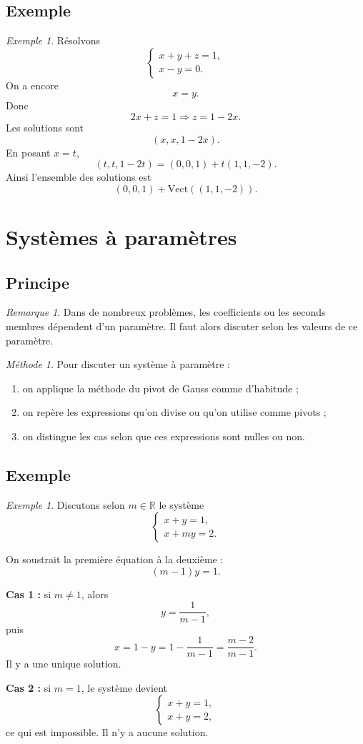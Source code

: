 \documentclass[11pt,a4paper]{article}
\theoremstyle{remark}
\newtheorem{remarque}[definition]{Remarque}
\newtheorem{exemple}[definition]{Exemple}
\newtheorem*{methode}{Méthode}
\newcommand{\R}{\mathbb{R}}
\newcommand{\Vect}{\mathrm{Vect}}
\begin{document}
\subsection{Exemple}

\begin{exemple}
Résolvons
\[
\begin{cases}
x+y+z=1,\\
x-y=0.
\end{cases}
\]
On a encore
\[
x=y.
\]
Donc
\[
2x+z=1 \Longrightarrow z=1-2x.
\]
Les solutions sont
\[
(x,x,1-2x).
\]
En posant \(x=t\),
\[
(t,t,1-2t)=(0,0,1)+t(1,1,-2).
\]
Ainsi l’ensemble des solutions est
\[
(0,0,1)+\Vect((1,1,-2)).
\]
\end{exemple}

\section{Systèmes à paramètres}

\subsection{Principe}

\begin{remarque}
Dans de nombreux problèmes, les coefficients ou les seconds membres dépendent d’un paramètre. Il faut alors discuter selon les valeurs de ce paramètre.
\end{remarque}

\begin{methode}
Pour discuter un système à paramètre :
\begin{enumerate}
    \item on applique la méthode du pivot de Gauss comme d’habitude ;
    \item on repère les expressions qu’on divise ou qu’on utilise comme pivots ;
    \item on distingue les cas selon que ces expressions sont nulles ou non.
\end{enumerate}
\end{methode}

\subsection{Exemple}

\begin{exemple}
Discutons selon \(m\in\R\) le système
\[
\begin{cases}
x+y=1,\\
x+my=2.
\end{cases}
\]

On soustrait la première équation à la deuxième :
\[
(m-1)y=1.
\]

\textbf{Cas 1 :} si \(m\neq 1\), alors
\[
y=\frac{1}{m-1},
\]
puis
\[
x=1-y=1-\frac{1}{m-1}=\frac{m-2}{m-1}.
\]
Il y a une unique solution.

\textbf{Cas 2 :} si \(m=1\), le système devient
\[
\begin{cases}
x+y=1,\\
x+y=2,
\end{cases}
\]
ce qui est impossible. Il n’y a aucune solution.
\end{exemple}
\end{document}
